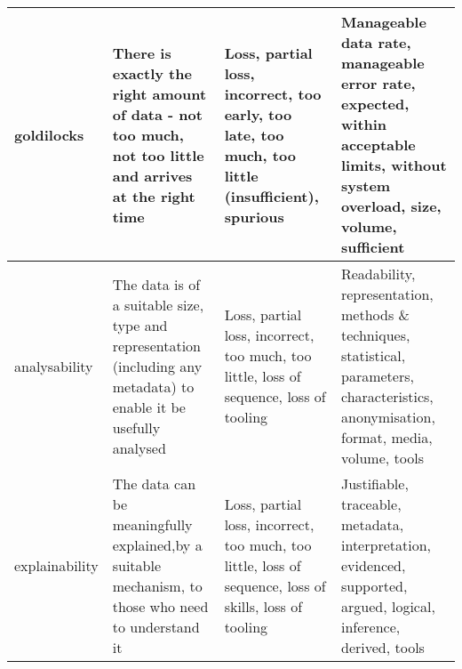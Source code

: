 \begin{longtable}{|L{}|L{}|L{}|L{}|}
  \hline
  \Gls{goldilocks} &
  There is exactly the right amount of data - not too much, not too little and arrives at the right time &
  {Loss, partial loss, incorrect, too early, too late, too much, too little (insufficient), spurious} &
  Manageable data rate, manageable error rate, expected, within acceptable limits, without system overload, size, volume, sufficient\\
  \hline
  \Gls{analysability} &
  The data is of a suitable size, type and representation (including any \gls{metadata}) to enable it be usefully analysed &
  {Loss, partial loss, incorrect, too much, too little, loss of sequence, loss of tooling} &
  Readability, representation, methods \& techniques, statistical, parameters, characteristics, anonymisation, \gls{format}{}, media, volume, tools
  \\
  \hline
  \Gls{explainability} &
  The data can be meaningfully explained,by a suitable mechanism, to those who need to understand it &
  {Loss, partial loss, incorrect, too much, too little, loss of sequence, loss of skills, loss of tooling} &
  Justifiable, traceable, \gls{metadata}, interpretation, evidenced, supported, argued, logical, inference, derived, tools
  \\
  \hline
\end{longtable}

